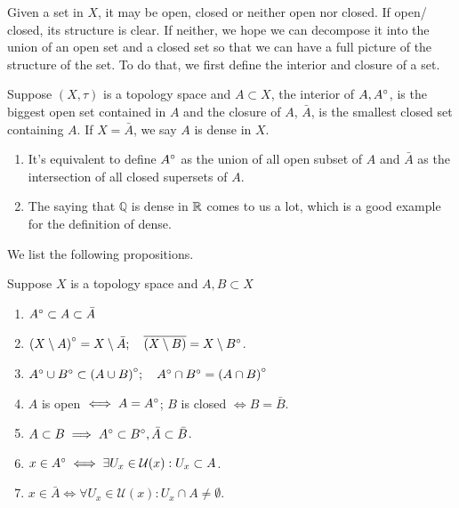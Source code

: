 Given a set in $X$, it may be open, closed or neither open nor closed. If open/ closed, its structure is clear. If neither, we hope we can decompose it into the union of an open set and a closed set so that we can have a full picture of the structure of the set. 
To do that, we first define the interior and closure of a set.
\begin{definition}
    Suppose $(X,\tau)$ is a topology space and $A \subset X$, the interior of $A, {A}^{\circ}$, is the biggest open set contained in $A$ and the closure of $A$, $\bar{A}$, 
    is the smallest closed set containing $A$. If $X = \bar{A}$, we say $A$ is dense in $X$.
\end{definition}

\begin{remark}
    \begin{enumerate}
        \item It's equivalent to define ${A}^{\circ}$ as the union of all open subset of $A$ and $\bar{A}$ as the intersection of all closed supersets of $A$.
        \item The saying that $\mathbb{Q}$ is dense in $\mathbb{R}$ comes to us a lot, which is a good example for the definition of dense. 
    \end{enumerate}
\end{remark}

We list the following propositions.
\begin{proposition}
    Suppose $X$ is a topology space and $A,B\subset X$
    \begin{enumerate}
        \item ${A}^{\circ} \subset A \subset \bar{A}$
        \item ${(X\setminus A)}^{\circ} = X \setminus \bar{A};\quad \overline{(X\setminus B)} = X \setminus {B}^{\circ}$.
        \item ${A}^{\circ} \cup {B}^{\circ} \subset {(A\cup B)}^{\circ};\quad {A}^{\circ} \cap {B}^{\circ} = {(A\cap B)}^{\circ}$
        \item $A$ is open $\iff A = {A}^{\circ}$; $B$ is closed $\iff B = \bar{B}$.
        \item $A\subset B \implies {A}^{\circ} \subset {B}^{\circ}, \bar{A} \subset \bar{B}$.
        \item $x \in {A}^{\circ} \iff \exists U_x \in \mathcal{U}(x): U_x \subset A$.
        \item $x\in \bar{A} \iff \forall U_x \in \mathcal{U}(x): U_x \cap A \neq \emptyset$.
    \end{enumerate}
\end{proposition}

